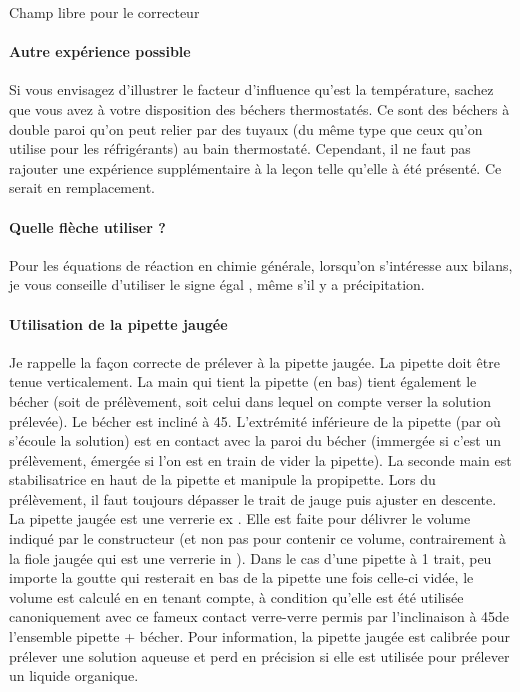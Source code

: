 \begin{reportBlock}{Champ libre pour le correcteur}
\paragraph*{Autre expérience possible} Si vous envisagez d'illustrer le facteur d'influence qu'est la température, sachez que vous avez à votre disposition des béchers thermostatés. Ce sont des béchers à double paroi qu'on peut relier par des tuyaux (du même type que ceux qu'on utilise pour les réfrigérants) au bain thermostaté. Cependant, il ne faut pas rajouter une expérience supplémentaire à la leçon telle qu'elle à été présenté. Ce serait en remplacement.\\

\paragraph*{Quelle flèche utiliser ?} Pour les équations de réaction en chimie générale, lorsqu'on s'intéresse aux bilans, je vous conseille d'utiliser le signe \og égal \fg{}, même s'il y a précipitation.\\

\paragraph*{Utilisation de la pipette jaugée} Je rappelle la façon correcte de prélever à la pipette jaugée. La pipette doit être tenue verticalement. La main qui tient la pipette (en bas) tient également le bécher (soit de prélèvement, soit celui dans lequel on compte verser la solution prélevée). Le bécher est incliné à 45\degre . L'extrémité inférieure de la pipette (par où s'écoule la solution) est en contact avec la paroi du bécher (immergée si c'est un prélèvement, émergée si l'on est en train de vider la pipette). La seconde main est stabilisatrice en haut de la pipette et manipule la propipette. Lors du prélèvement, il faut toujours dépasser le trait de jauge puis ajuster en descente. La pipette jaugée est une verrerie \og ex \fg{}. Elle est faite pour délivrer le volume indiqué par le constructeur (et non pas pour contenir ce volume, contrairement à la fiole jaugée qui est une verrerie \og in \fg{} ). Dans le cas d'une pipette à 1 trait, peu importe la goutte qui resterait en bas de la pipette une fois celle-ci vidée, le volume est calculé en en tenant compte, à condition qu'elle est été utilisée canoniquement avec ce fameux contact verre-verre permis par l'inclinaison à 45\degre de l'ensemble pipette + bécher. Pour information, la pipette jaugée est calibrée pour prélever une solution aqueuse et perd en précision si elle est utilisée pour prélever un liquide organique.

\end{reportBlock}